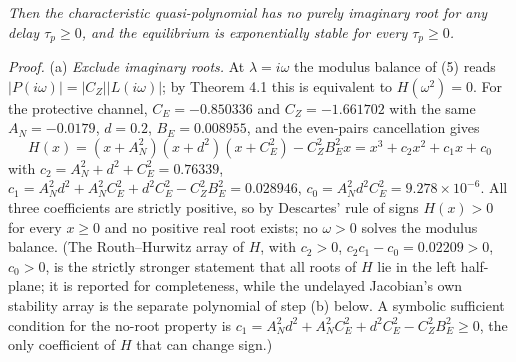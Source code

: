 \documentclass[11pt]{article}
\begin{document}
\emph{Then the characteristic quasi-polynomial has no purely imaginary
root for any delay \(\tau_p \ge 0\), and the equilibrium is
exponentially stable for every \(\tau_p \ge 0\).}

\emph{Proof.} (a) \emph{Exclude imaginary roots.} At
\(\lambda = i\omega\) the modulus balance of (5) reads
\(|P(i\omega)| = |C_Z||L(i\omega)|\); by Theorem 4.1 this is equivalent
to \(H(\omega^2) = 0\). For the protective channel, \(C_E = -0.850336\)
and \(C_Z = -1.661702\) with the same \(A_N = -0.0179\), \(d = 0.2\),
\(B_E = 0.008955\), and the even-pairs cancellation gives
\[H(x) = (x + A_N^2)(x + d^2)(x + C_E^2) - C_Z^2 B_E^2 x = x^3 + c_2 x^2 + c_1 x + c_0\]
with \(c_2 = A_N^2 + d^2 + C_E^2 = 0.76339\),
\(c_1 = A_N^2 d^2 + A_N^2 C_E^2 + d^2 C_E^2 - C_Z^2 B_E^2 = 0.028946\),
\(c_0 = A_N^2 d^2 C_E^2 = 9.278\times10^{-6}\). All three coefficients
are strictly positive, so by Descartes' rule of signs \(H(x) > 0\) for
every \(x \ge 0\) and no positive real root exists; no \(\omega > 0\)
solves the modulus balance. (The Routh--Hurwitz array of \(H\), with
\(c_2 > 0\), \(c_2 c_1 - c_0 = 0.02209 > 0\), \(c_0 > 0\), is the
strictly stronger statement that all roots of \(H\) lie in the left
half-plane; it is reported for completeness, while the undelayed
Jacobian's own stability array is the separate polynomial of step (b)
below. A symbolic sufficient condition for the no-root property is
\(c_1 = A_N^2 d^2 + A_N^2 C_E^2 + d^2 C_E^2 - C_Z^2 B_E^2 \ge 0\), the
only coefficient of \(H\) that can change sign.)
\end{document}
